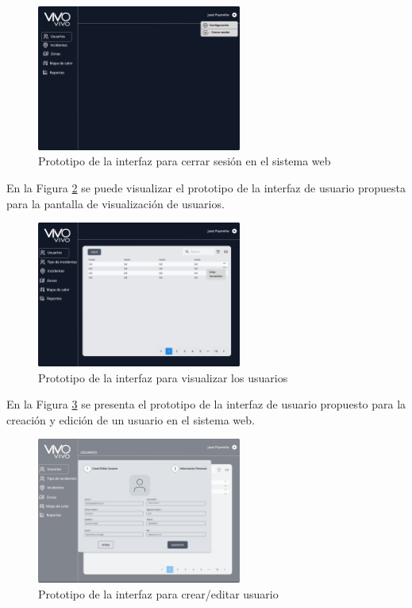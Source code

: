 \begin{figure}[H]
      \centering
      \includegraphics[width=0.6\textwidth]{chapters/III-resultados-y-discusion/resources/images/prototipo-layout-web.png}
      \caption{Prototipo de la interfaz para cerrar sesión en el sistema web}
      \label{fig:prototipo-layout-web}
\end{figure}

En la Figura \ref{fig:prototipo-interfaz-usuario-web-3} se puede visualizar el prototipo de la interfaz de usuario
propuesta para la pantalla de visualización de usuarios.

\begin{figure}[H]
      \centering
      \includegraphics[width=0.6\textwidth]{chapters/III-resultados-y-discusion/resources/images/prototipo-menu-tabla-entradas-web.png}
      \caption{Prototipo de la interfaz para visualizar los usuarios}
      \label{fig:prototipo-interfaz-usuario-web-3}
\end{figure}

En la Figura \ref{fig:prototipo-interfaz-usuario-web-4} se presenta el prototipo de la interfaz de usuario propuesto para
la creación y edición de un usuario en el sistema web.

\begin{figure}[H]
      \centering
      \includegraphics[width=0.6\textwidth]{chapters/III-resultados-y-discusion/resources/images/prototipo-formulario-usuario-web.png}
      \caption{Prototipo de la interfaz para crear/editar usuario}
      \label{fig:prototipo-interfaz-usuario-web-4}
\end{figure}

